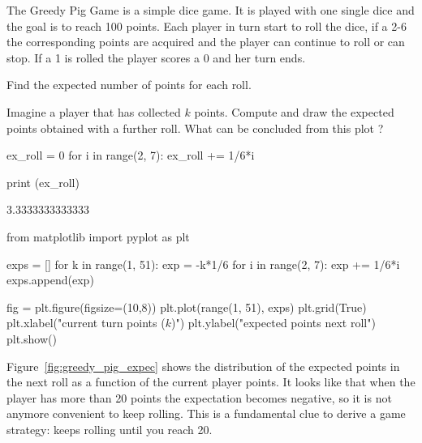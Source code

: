 \begin{question}
\label{ex:greedy_pig}
The Greedy Pig Game is a simple dice game. It is played with one single dice and the goal is to reach 100 points. Each player in turn start to roll the dice, if a 2-6 the corresponding points are acquired and the player can continue to roll or can stop. If a 1 is rolled the player scores a 0 and her turn ends.

Find the expected number of points for each roll.

Imagine a player that has collected $k$ points. Compute and draw the expected points obtained with a further roll. What can be concluded from this plot ?
\end{question}

\cprotEnv\begin{solution}
\begin{ipython}
ex_roll = 0
for i in range(2, 7):
    ex_roll += 1/6*i

print (ex_roll)
\end{ipython}
\begin{ioutput}
3.3333333333333
\end{ioutput}

\begin{ipython}
from matplotlib import pyplot as plt

exps = []
for k in range(1, 51):
    exp = -k*1/6
    for i in range(2, 7):
        exp += 1/6*i
    exps.append(exp)

fig = plt.figure(figsize=(10,8))
plt.plot(range(1, 51), exps)
plt.grid(True)
plt.xlabel("current turn points ($k$)")
plt.ylabel("expected points next roll")
plt.show()
\end{ipython}

Figure~\ref{fig:greedy_pig_expec} shows the distribution of the expected points in the next roll as a function of the current player points. It looks like that when the player has more than 20 points the expectation becomes negative, so it is not anymore convenient to keep rolling. This is a fundamental clue to derive a game strategy: keeps rolling until you reach 20.


\end{solution}
